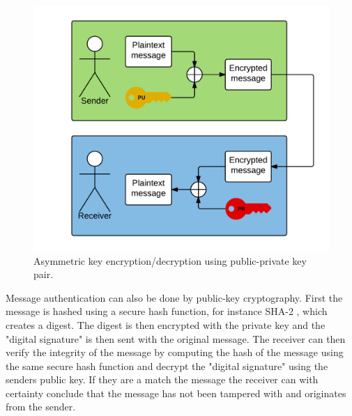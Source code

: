 \begin{figure}[h!]
  \captionsetup{justification=centering,margin=1.5cm}
  \caption{Asymmetric key encryption/decryption using public-private key pair.}
  \label{fig:encrypt_basic}
  \centering
    \includegraphics[width=1\textwidth]{images/encrypt_basic.png}
\end{figure}

Message authentication can also be done by public-key cryptography. First the message is hashed using a secure hash function, for instance SHA-2 \cite{shaRFC}, which creates a digest. The digest is then encrypted with the private key and the "digital signature" is then sent with the original message. The receiver can then verify the integrity of the message by computing the hash of the message using the same secure hash function and decrypt the "digital signature" using the senders public key. If they are a match the message the receiver can with certainty conclude that the message has not been tampered with and originates from the sender.

